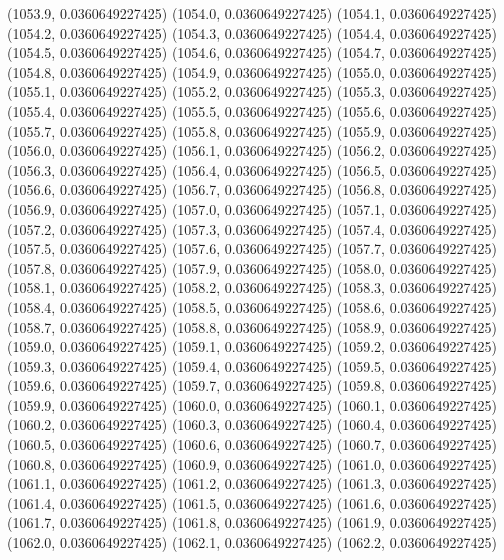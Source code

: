 {					(1053.9, 0.0360649227425)
					(1054.0, 0.0360649227425)
					(1054.1, 0.0360649227425)
					(1054.2, 0.0360649227425)
					(1054.3, 0.0360649227425)
					(1054.4, 0.0360649227425)
					(1054.5, 0.0360649227425)
					(1054.6, 0.0360649227425)
					(1054.7, 0.0360649227425)
					(1054.8, 0.0360649227425)
					(1054.9, 0.0360649227425)
					(1055.0, 0.0360649227425)
					(1055.1, 0.0360649227425)
					(1055.2, 0.0360649227425)
					(1055.3, 0.0360649227425)
					(1055.4, 0.0360649227425)
					(1055.5, 0.0360649227425)
					(1055.6, 0.0360649227425)
					(1055.7, 0.0360649227425)
					(1055.8, 0.0360649227425)
					(1055.9, 0.0360649227425)
					(1056.0, 0.0360649227425)
					(1056.1, 0.0360649227425)
					(1056.2, 0.0360649227425)
					(1056.3, 0.0360649227425)
					(1056.4, 0.0360649227425)
					(1056.5, 0.0360649227425)
					(1056.6, 0.0360649227425)
					(1056.7, 0.0360649227425)
					(1056.8, 0.0360649227425)
					(1056.9, 0.0360649227425)
					(1057.0, 0.0360649227425)
					(1057.1, 0.0360649227425)
					(1057.2, 0.0360649227425)
					(1057.3, 0.0360649227425)
					(1057.4, 0.0360649227425)
					(1057.5, 0.0360649227425)
					(1057.6, 0.0360649227425)
					(1057.7, 0.0360649227425)
					(1057.8, 0.0360649227425)
					(1057.9, 0.0360649227425)
					(1058.0, 0.0360649227425)
					(1058.1, 0.0360649227425)
					(1058.2, 0.0360649227425)
					(1058.3, 0.0360649227425)
					(1058.4, 0.0360649227425)
					(1058.5, 0.0360649227425)
					(1058.6, 0.0360649227425)
					(1058.7, 0.0360649227425)
					(1058.8, 0.0360649227425)
					(1058.9, 0.0360649227425)
					(1059.0, 0.0360649227425)
					(1059.1, 0.0360649227425)
					(1059.2, 0.0360649227425)
					(1059.3, 0.0360649227425)
					(1059.4, 0.0360649227425)
					(1059.5, 0.0360649227425)
					(1059.6, 0.0360649227425)
					(1059.7, 0.0360649227425)
					(1059.8, 0.0360649227425)
					(1059.9, 0.0360649227425)
					(1060.0, 0.0360649227425)
					(1060.1, 0.0360649227425)
					(1060.2, 0.0360649227425)
					(1060.3, 0.0360649227425)
					(1060.4, 0.0360649227425)
					(1060.5, 0.0360649227425)
					(1060.6, 0.0360649227425)
					(1060.7, 0.0360649227425)
					(1060.8, 0.0360649227425)
					(1060.9, 0.0360649227425)
					(1061.0, 0.0360649227425)
					(1061.1, 0.0360649227425)
					(1061.2, 0.0360649227425)
					(1061.3, 0.0360649227425)
					(1061.4, 0.0360649227425)
					(1061.5, 0.0360649227425)
					(1061.6, 0.0360649227425)
					(1061.7, 0.0360649227425)
					(1061.8, 0.0360649227425)
					(1061.9, 0.0360649227425)
					(1062.0, 0.0360649227425)
					(1062.1, 0.0360649227425)
					(1062.2, 0.0360649227425)
}
